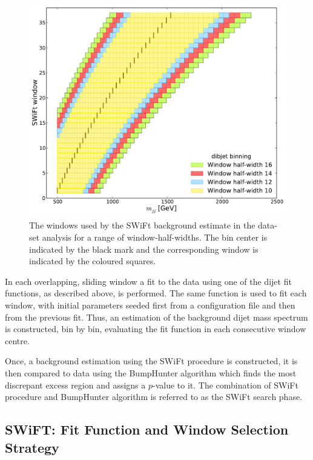 \begin{figure}[!htb]
\centering
\includegraphics[scale=0.5, angle=0]{figs/Dibjet/LowMass/evt-swiftBins_min500_fl0_fh0_tr0.pdf}
\vspace{10pt}
\caption{\label{fig:bkg-lm_swiftBins}
  The windows used by the SWiFt background estimate in the \lm{} data-set analysis for a range of window-half-widths.
  The bin center is indicated by the black mark and the corresponding window is indicated by the coloured squares.}
\end{figure}

In each overlapping, sliding window a fit to the data using one of the dijet fit functions, as described above, is performed.
The same function is used to fit each window,
with initial parameters seeded first from a configuration file and then from the previous fit.
Thus, an estimation of the background dijet mass spectrum is constructed, bin by bin, evaluating the fit
function in each consecutive window centre.

Once, a background estimation using the SWiFt procedure is constructed,
it is then compared to data using the {\sc BumpHunter} algorithm which finds the most discrepant excess region and assigns a $p$-value to it.
The combination of SWiFt procedure and {\sc BumpHunter} algorithm is referred to as the SWiFt search phase.


\subsection{SWiFT: Fit Function and Window Selection Strategy}
\label{sec:windowSel}


